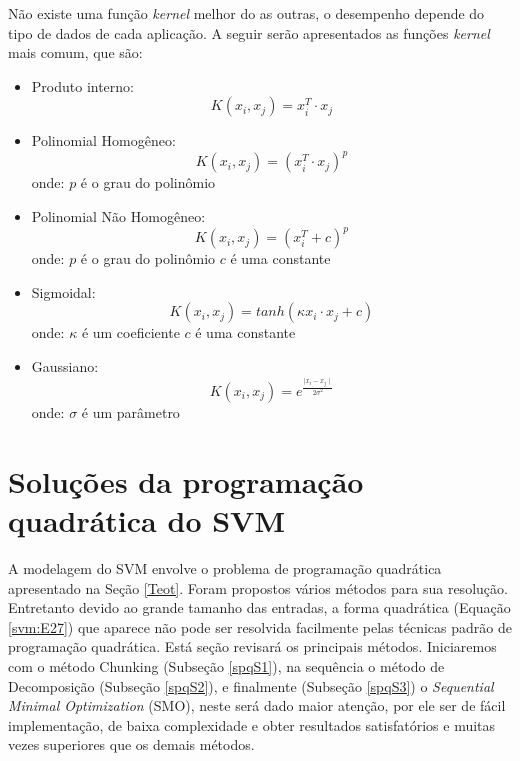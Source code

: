 Não existe uma função \textit{kernel} melhor do as outras, o desempenho depende do tipo de dados de cada aplicação. A seguir serão apresentados as funções \textit{kernel} mais comum, que são:
\begin{itemize}
\item Produto interno:
\begin{equation}
K(x_{i},x_{j}) = x_{i}^T \cdot x_{j}
\end{equation}

\item Polinomial Homogêneo:
\begin{equation}
K(x_{i},x_{j}) = (x_{i}^T \cdot x_{j})^p
\end{equation}
onde:
$p$ é o grau do polinômio

\item Polinomial Não Homogêneo:
\begin{equation}
K(x_{i},x_{j}) = (x_{i}^T + c)^p
\end{equation}
onde:
$p$ é o grau do polinômio
$c$ é uma constante

\item Sigmoidal:
\begin{equation}
K(x_{i},x_{j}) = tanh(\kappa x_{i} \cdot x_{j} + c)
\end{equation}
onde:
$\kappa$ é um coeficiente
$c$ é uma constante

\item Gaussiano:
\begin{equation}
K(x_{i},x_{j}) = e^{\frac{\mid x_{i} - x_{j} \mid}{2\sigma^2} }
\end{equation}
onde:
$\sigma$ é um parâmetro
\end{itemize}

\section{Soluções da programação quadrática do SVM}\label{spq}

A modelagem do SVM envolve o problema de programação quadrática apresentado na Seção \ref{Teot}. Foram propostos vários métodos para sua resolução. Entretanto devido ao grande tamanho das entradas, a forma quadrática (Equação \ref{svm:E27}) que aparece não pode ser resolvida facilmente pelas técnicas padrão de programação quadrática. Está seção revisará os principais métodos. Iniciaremos com o método Chunking (Subseção \ref{spqS1}), na sequência o método de Decomposição (Subseção \ref{spqS2}), e finalmente (Subseção \ref{spqS3}) o \textit{Sequential Minimal Optimization} (SMO), neste será dado maior atenção, por ele ser de fácil implementação, de baixa complexidade e obter resultados satisfatórios e muitas vezes superiores que os demais métodos.

